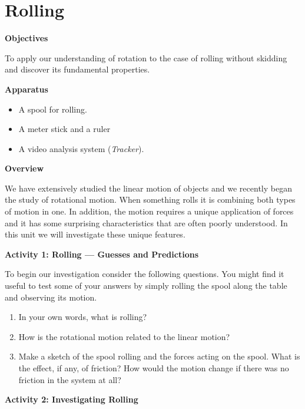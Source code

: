 
\section{Rolling}

\makelabheader %

\textbf{Objectives }

To apply our understanding of rotation to the case of rolling without skidding
and discover its fundamental properties. 

\textbf{Apparatus}

\begin{itemize}
\item A spool for rolling. 
\item A meter stick and a ruler 
\item A video analysis system (\textit{Tracker}).
\end{itemize}
\textbf{Overview }

We have extensively studied the linear motion of objects and we recently began
the study of rotational motion. When something rolls it is combining both types
of motion in one. In addition, the motion requires a unique application of forces
and it has some surprising characteristics that are often poorly understood.
In this unit we will investigate these unique features.

\textbf{Activity 1: Rolling --- Guesses and Predictions }

To begin our investigation consider the following questions. You might find
it useful to test some of your answers by simply rolling the spool along the
table and observing its motion.

\begin{enumerate}
\item In your own words, what is rolling?
\answerspace{20mm}

\item How is the rotational motion related to the linear motion?
\answerspace{20mm}

\item Make a sketch of the spool rolling and the forces acting on the spool. What
is the effect, if any, of friction? How would the motion change if there was
no friction in the system at all?
\answerspace{30mm}
\end{enumerate}

\pagebreak[2]
\textbf{Activity 2: Investigating Rolling} 

